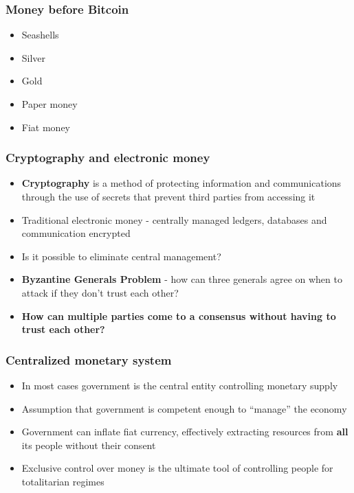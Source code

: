 \documentclass{beamer}
\begin{document}
\begin{frame}
  \frametitle{Money before Bitcoin}
  \begin{itemize}
  \item Seashells
  \item Silver
  \item Gold
  \item Paper money
  \item Fiat money
  \end{itemize}
\end{frame}

\begin{frame}
  \frametitle{Cryptography and electronic money}
  \begin{itemize}
  \item \textbf{Cryptography} is a method of protecting information and
    communications through the use of secrets that prevent third parties from
    accessing it
  \item Traditional electronic money - centrally managed ledgers, databases and
    communication encrypted
  \item Is it possible to eliminate central management?
  \item \textbf{Byzantine Generals Problem} - how can three generals agree on when
    to attack if they don't trust each other?
  \item \textbf{How can multiple parties come to a consensus without having to
      trust each other?}
  \end{itemize}
\end{frame}

\begin{frame}
  \frametitle{Centralized monetary system}
  \begin{itemize}
  \item In most cases government is the central entity controlling monetary
    supply
  \item Assumption that government is competent enough to ``manage'' the economy
  \item Government can inflate fiat currency, effectively extracting resources
    from \textbf{all} its people without their consent
  \item Exclusive control over money is the ultimate tool of controlling people
    for totalitarian regimes
  \end{itemize}
\end{frame}
\end{document}
